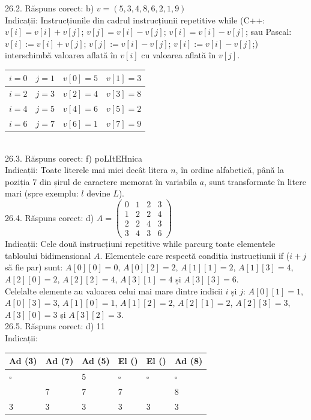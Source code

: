 26.2. Răspuns corect: b) $v=(5,3,4,8,6,2,1,9)$\\
Indicații: Instrucțiunile din cadrul instrucțiunii repetitive while (C++: $v[i]=v[i]+v[j]$; $v[j]=v[i]-v[j]$; $v[i]=v[i]-v[j]$; sau Pascal: $v[i]:=v[i]+v[j]$; $v[j]:=v[i]-v[j]$; $v[i]:=v[i]-v[j]$;) interschimbă valoarea aflată în $v[i]$ cu valoarea aflată în $v[j]$.\\ \begin{tabular}{|c|c|c|c|} \hline$i=0$ & $j=1$ & $v[0]=5$ & $v[1]=3$ \\ \hline$i=2$ & $j=3$ & $v[2]=4$ & $v[3]=8$ \\ \hline$i=4$ & $j=5$ & $v[4]=6$ & $v[5]=2$ \\ \hline$i=6$ & $j=7$ & $v[6]=1$ & $v[7]=9$ \\ \hline \end{tabular}\\

26.3. Răspuns corect: f) poLItEHnica\\
Indicații: Toate literele mai mici decât litera $n$, în ordine alfabetică, până la poziția 7 din șirul de caractere memorat în variabila $a$, sunt transformate în litere mari (spre exemplu: $l$ devine $L$).\\

26.4. Răspuns corect: d) $A=\left(\begin{array}{llll}0 & 1 & 2 & 3 \\ 1 & 2 & 2 & 4 \\ 2 & 2 & 4 & 3 \\ 3 & 4 & 3 & 6\end{array}\right)$\\
Indicații: Cele două instrucțiuni repetitive while parcurg toate elementele tabloului bidimensional $A$. Elementele care respectă condiția instrucțiunii if ($i+j$ să fie par) sunt: $A[0][0]=0$, $A[0][2]=2$, $A[1][1]=2$, $A[1][3]=4$, $A[2][0]=2$, $A[2][2]=4$, $A[3][1]=4$ și $A[3][3]=6$.\\ Celelalte elemente au valoarea celui mai mare dintre indicii $i$ și $j$: $A[0][1]=1$, $A[0][3]=3$, $A[1][0]=1$, $A[1][2]=2$, $A[2][1]=2$, $A[2][3]=3$, $A[3][0]=3$ și $A[3][2]=3$.\\

26.5. Răspuns corect: d) 11\\
Indicații:\\ \begin{tabular}{|l|l|l|l|l|l|} \hline Ad (3) & Ad (7) & Ad (5) & El () & El () & Ad (8) \\ \hline $\square$ & & 5 & $\square$ & $\square$ & $\square$ \\ \hline & 7 & 7 & 7 & & 8 \\ \hline 3 & 3 & 3 & 3 & 3 & 3 \\ \hline \end{tabular}\\

